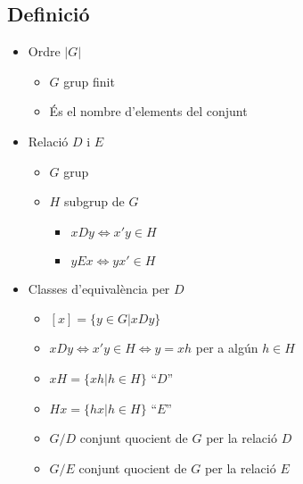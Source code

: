 \documentclass{article}
\begin{document}
\subsection*{Definició}
\begin{itemize}
\item Ordre $|G|$
	\begin{itemize}
	\item $G$ grup finit
	\item És el nombre d'elements del conjunt
	\end{itemize}
\item Relació $D$ i $E$
	\begin{itemize}
	\item $G$ grup
	\item $H$ subgrup de $G$
		\begin{itemize}
		\item $xDy \Leftrightarrow x'y \in H$
		\item $yEx \Leftrightarrow yx' \in H$
		\end{itemize}
	\end{itemize}
\item Classes d'equivalència per $D$
	\begin{itemize}
	\item $[x] = \{y \in G | xDy\}$
	\item $xDy \Leftrightarrow x'y \in H \Leftrightarrow y = xh$ per a algún $h \in H$
	\item $xH = \{xh | h \in H\}$ ``$D$''
	\item $Hx = \{hx | h \in H\}$ ``$E$''
	\item $G/D$ conjunt quocient de $G$ per la relació $D$
	\item $G/E$ conjunt quocient de $G$ per la relació $E$
	\end{itemize}
\end{itemize}
\end{document}
